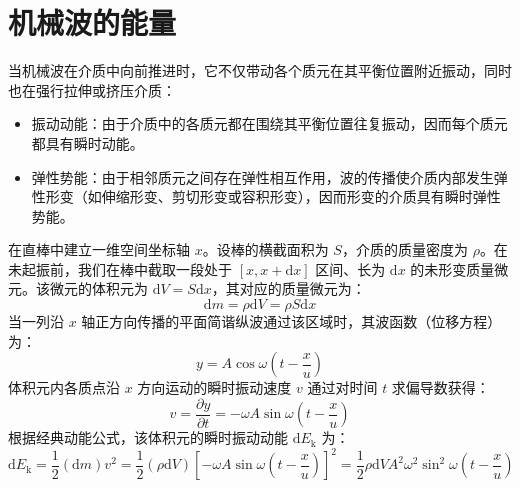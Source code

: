 
\section{机械波的能量}

当机械波在介质中向前推进时，它不仅带动各个质元在其平衡位置附近振动，同时也在强行拉伸或挤压介质：
\begin{itemize}
\item 振动动能：由于介质中的各质元都在围绕其平衡位置往复振动，因而每个质元都具有瞬时动能。
\item 弹性势能：由于相邻质元之间存在弹性相互作用，波的传播使介质内部发生弹性形变（如伸缩形变、剪切形变或容积形变），因而形变的介质具有瞬时弹性势能。
\end{itemize}

\begin{definition}[体积元的振动动能]
在直棒中建立一维空间坐标轴 $x$。设棒的横截面积为 $S$，介质的质量密度为 $\rho$。在未起振前，我们在棒中截取一段处于 $[x, x+\mathrm{d}x]$ 区间、长为 $\mathrm{d}x$ 的未形变质量微元。该微元的体积元为 $\mathrm{d}V = S\mathrm{d}x$，其对应的质量微元为：$$\mathrm{d}m = \rho \mathrm{d}V = \rho S \mathrm{d}x$$当一列沿 $x$ 轴正方向传播的平面简谐纵波通过该区域时，其波函数（位移方程）为：$$y = A \cos \omega \left( t - \frac{x}{u} \right)$$体积元内各质点沿 $x$ 方向运动的瞬时振动速度 $v$ 通过对时间 $t$ 求偏导数获得：$$v = \frac{\partial y}{\partial t} = -\omega A \sin \omega \left( t - \frac{x}{u} \right)$$根据经典动能公式，该体积元的瞬时振动动能 $\mathrm{d}E_{\text{k}}$ 为：$$\mathrm{d}E_{\text{k}} = \frac{1}{2}(\mathrm{d}m)v^2 = \frac{1}{2}(\rho \mathrm{d}V) \left[ -\omega A \sin \omega \left( t - \frac{x}{u} \right) \right]^2 = \frac{1}{2}\rho \mathrm{d}V A^2 \omega^2 \sin^2 \omega \left( t - \frac{x}{u} \right) $$
\end{definition}

